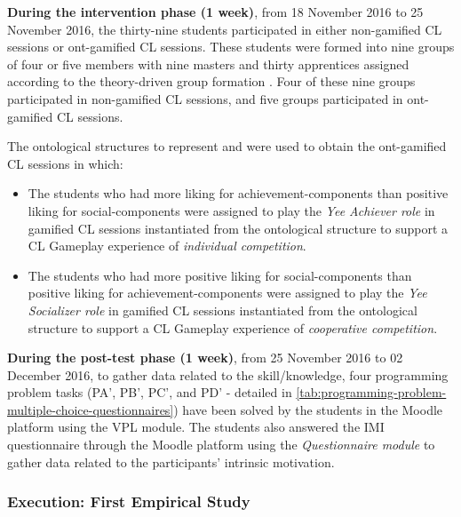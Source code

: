 \textbf{During the intervention phase (1 week)}, from 18 November 2016 to 25 November 2016, the thirty-nine students participated in either non-gamified CL sessions or ont-gamified CL sessions.
These students were formed into nine groups of four or five members with nine masters and thirty apprentices assigned according to the theory-driven group formation \cite{IsotaniMizoguchi2008a}.
Four of these nine groups participated in non-gamified CL sessions, and five groups participated in ont-gamified CL sessions.

The ontological structures to represent  and  were used to obtain the ont-gamified CL sessions in which:

\begin{itemize}
\item The students who had more liking for achievement-components than positive liking for social-components were assigned to play the \emph{Yee Achiever role} in gamified CL sessions instantiated from the ontological structure  to support a CL Gameplay experience of \emph{individual competition}.

\item The students who had more positive liking for social-components than positive liking for achievement-components were assigned to play the \emph{Yee Socializer role} in gamified CL sessions instantiated from the ontological structure  to support a CL Gameplay experience of \emph{cooperative competition}.
\end{itemize}

\textbf{During the post-test phase (1 week)}, from 25 November 2016 to 02 December 2016, to gather data related to the skill/knowledge, four programming problem tasks (PA', PB', PC', and PD' - detailed in \autoref{tab:programming-problem-multiple-choice-questionnaires}) have been solved by the students in the Moodle platform using the VPL module.
The students also answered the IMI questionnaire through the Moodle platform using the \emph{Questionnaire module} to gather data related to the participants' intrinsic motivation.

\subsubsection{Execution: First Empirical Study}

